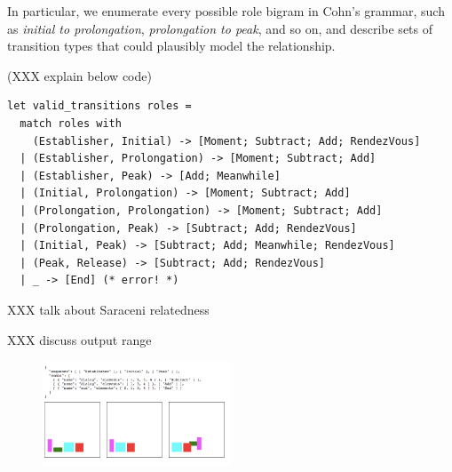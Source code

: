 In particular, we enumerate every possible role bigram in Cohn's grammar,
such as {\em initial to prolongation}, {\em prolongation to peak}, and so
on, and describe sets of transition types that could plausibly model the
relationship.

(XXX explain below code)

\begin{Verbatim}[fontsize=\scriptsize]
let valid_transitions roles =
  match roles with
    (Establisher, Initial) -> [Moment; Subtract; Add; RendezVous]
  | (Establisher, Prolongation) -> [Moment; Subtract; Add]
  | (Establisher, Peak) -> [Add; Meanwhile]
  | (Initial, Prolongation) -> [Moment; Subtract; Add]
  | (Prolongation, Prolongation) -> [Moment; Subtract; Add]
  | (Prolongation, Peak) -> [Subtract; Add; RendezVous]
  | (Initial, Peak) -> [Subtract; Add; Meanwhile; RendezVous]
  | (Peak, Release) -> [Subtract; Add; RendezVous]
  | _ -> [End] (* error! *)
\end{Verbatim}

XXX talk about Saraceni relatedness

XXX discuss output range

\begin{figure}
\includegraphics[width=0.5\textwidth]{comicgen-output-constrained-1.png}
\end{figure}



